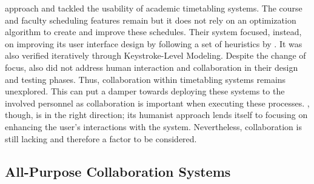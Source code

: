 approach and tackled the usability of academic timetabling systems. The course and faculty scheduling features remain but it does not rely on an optimization algorithm to create and improve these schedules. Their system focused, instead, on improving its user interface design by following a set of heuristics by \cite{Paz}. It was also verified iteratively through Keystroke-Level Modeling. Despite the change of focus, \cite{arrowSmith} also did not address human interaction and collaboration in their design and testing phases. Thus, collaboration within timetabling systems remains unexplored. This can put a damper towards deploying these systems to the involved personnel as collaboration is important when executing these processes. \cite{arrowSmith}, though, is in the right direction; its humanist approach lends itself to focusing on enhancing the user's interactions with the system. Nevertheless, collaboration is still lacking and therefore a factor to be considered.


\subsection{All-Purpose Collaboration Systems}

